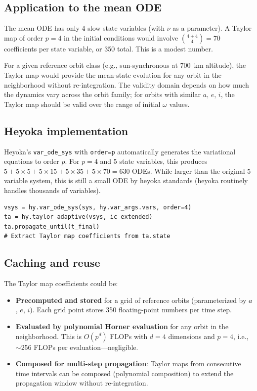 \documentclass[11pt]{article}
\begin{document}
\subsection{Application to the mean ODE}

The mean ODE has only 4 slow state variables (with $\bar\nu$ as a parameter).
A Taylor map of order $p = 4$ in the initial conditions would involve
$\binom{4 + 4}{4} = 70$ coefficients per state variable, or 350 total. This
is a modest number.

For a given reference orbit class (e.g., sun-synchronous at 700~km altitude),
the Taylor map would provide the mean-state evolution for any orbit in the
neighborhood without re-integration. The validity domain depends on how much
the dynamics vary across the orbit family; for orbits with similar $a$, $e$,
$i$, the Taylor map should be valid over the range of initial $\omega$ values.

\subsection{Heyoka implementation}

Heyoka's \texttt{var\_ode\_sys} with \texttt{order=p} automatically generates
the variational equations to order $p$. For $p = 4$ and 5 state variables,
this produces $5 + 5 \times 5 + 5 \times 15 + 5 \times 35 + 5 \times 70
= 630$ ODEs. While larger than the original 5-variable system, this is still
a small ODE by heyoka standards (heyoka routinely handles thousands of
variables).

\begin{verbatim}
vsys = hy.var_ode_sys(sys, hy.var_args.vars, order=4)
ta = hy.taylor_adaptive(vsys, ic_extended)
ta.propagate_until(t_final)
# Extract Taylor map coefficients from ta.state
\end{verbatim}

\subsection{Caching and reuse}

The Taylor map coefficients could be:
\begin{itemize}
\item \textbf{Precomputed and stored} for a grid of reference orbits
(parameterized by $a$, $e$, $i$). Each grid point stores 350 floating-point
numbers per time step.

\item \textbf{Evaluated by polynomial Horner evaluation} for any orbit in
the neighborhood. This is $O(p^d)$ FLOPs with $d = 4$ dimensions and
$p = 4$, i.e., $\sim$256 FLOPs per evaluation---negligible.

\item \textbf{Composed for multi-step propagation}: Taylor maps from
consecutive time intervals can be composed (polynomial composition) to extend
the propagation window without re-integration.
\end{itemize}
\end{document}
